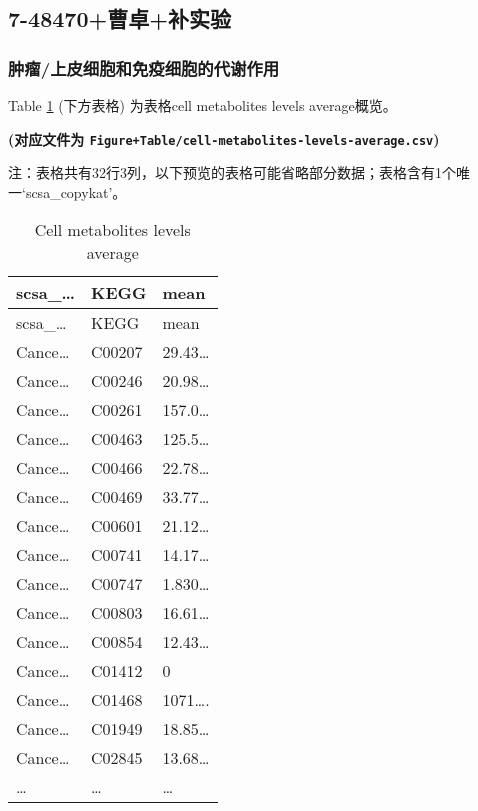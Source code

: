 \documentclass[
]{article}
\begin{document}
\hypertarget{ux66f9ux5353ux8865ux5b9eux9a8c-1}{%
\subsection{7-48470+曹卓+补实验}\label{ux66f9ux5353ux8865ux5b9eux9a8c-1}}

\hypertarget{ux80bfux7624ux4e0aux76aeux7ec6ux80deux548cux514dux75abux7ec6ux80deux7684ux4ee3ux8c22ux4f5cux7528-1}{%
\subsubsection{肿瘤/上皮细胞和免疫细胞的代谢作用}\label{ux80bfux7624ux4e0aux76aeux7ec6ux80deux548cux514dux75abux7ec6ux80deux7684ux4ee3ux8c22ux4f5cux7528-1}}

Table \ref{tab:cell-metabolites-levels-average} (下方表格) 为表格cell metabolites levels average概览。

\textbf{(对应文件为 \texttt{Figure+Table/cell-metabolites-levels-average.csv})}

\begin{center}\begin{tcolorbox}[colback=gray!10, colframe=gray!50, width=0.9\linewidth, arc=1mm, boxrule=0.5pt]注：表格共有32行3列，以下预览的表格可能省略部分数据；表格含有1个唯一`scsa\_copykat'。
\end{tcolorbox}
\end{center}

\begin{longtable}[]{@{}lll@{}}
\caption{\label{tab:cell-metabolites-levels-average}Cell metabolites levels average}\tabularnewline
\toprule
scsa\_\ldots{} & KEGG & mean\tabularnewline
\midrule
\endfirsthead
\toprule
scsa\_\ldots{} & KEGG & mean\tabularnewline
\midrule
\endhead
Cance\ldots{} & C00207 & 29.43\ldots{}\tabularnewline
Cance\ldots{} & C00246 & 20.98\ldots{}\tabularnewline
Cance\ldots{} & C00261 & 157.0\ldots{}\tabularnewline
Cance\ldots{} & C00463 & 125.5\ldots{}\tabularnewline
Cance\ldots{} & C00466 & 22.78\ldots{}\tabularnewline
Cance\ldots{} & C00469 & 33.77\ldots{}\tabularnewline
Cance\ldots{} & C00601 & 21.12\ldots{}\tabularnewline
Cance\ldots{} & C00741 & 14.17\ldots{}\tabularnewline
Cance\ldots{} & C00747 & 1.830\ldots{}\tabularnewline
Cance\ldots{} & C00803 & 16.61\ldots{}\tabularnewline
Cance\ldots{} & C00854 & 12.43\ldots{}\tabularnewline
Cance\ldots{} & C01412 & 0\tabularnewline
Cance\ldots{} & C01468 & 1071\ldots.\tabularnewline
Cance\ldots{} & C01949 & 18.85\ldots{}\tabularnewline
Cance\ldots{} & C02845 & 13.68\ldots{}\tabularnewline
\ldots{} & \ldots{} & \ldots{}\tabularnewline
\bottomrule
\end{longtable}
\end{document}
